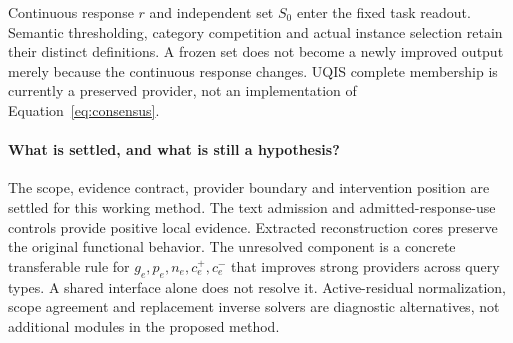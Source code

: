 Continuous response $r$ and independent set $S_0$ enter the fixed task readout.
Semantic thresholding, category competition and actual instance selection
retain their distinct definitions. A frozen set does not become a newly
improved output merely because the continuous response changes. UQIS complete
membership is currently a preserved provider, not an implementation of
Equation~\ref{eq:consensus}.

\paragraph{What is settled, and what is still a hypothesis?}
The scope, evidence contract, provider boundary and intervention position are
settled for this working method. The text admission and admitted-response-use
controls provide positive local evidence. Extracted reconstruction cores
preserve the original functional behavior. The unresolved component is a
concrete transferable rule for $g_e,p_e,n_e,c_e^+,c_e^-$ that improves strong
providers across query types. A shared interface alone does not resolve it.
Active-residual normalization, scope agreement and replacement inverse solvers
are diagnostic alternatives, not additional modules in the proposed method.

\begin{table}[ht]
\centering\small
\resizebox{\linewidth}{!}{}
\caption{Claims bound to their actual evidence. Historical local controls,
functional preservation, diagnostic findings and open transfer claims have
different evidential roles; their gains cannot be added or substituted.}
\label{tab:claims}
\end{table}
